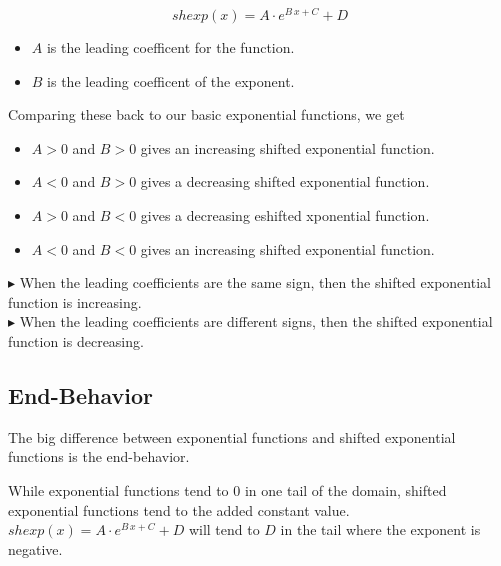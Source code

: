 \documentclass{ximera}
\begin{document}
\[
shexp(x) = A \cdot e^{B \, x + C} + D
\]





\begin{itemize}
  \item $A$ is the leading coefficent for the function.
  \item $B$ is the leading coefficent of the exponent.
\end{itemize}


Comparing these back to our basic exponential functions, we get



\begin{itemize}
  \item $A > 0$ and $B > 0$ gives an increasing shifted exponential function.
  \item $A < 0$ and $B > 0$ gives a decreasing shifted exponential function.
  \item $A > 0$ and $B < 0$ gives a decreasing eshifted xponential function.
  \item $A < 0$ and $B < 0$ gives an increasing shifted exponential function.
\end{itemize}


$\blacktriangleright$ When the leading coefficients are the same sign, then the shifted exponential function is increasing. \\

$\blacktriangleright$ When the leading coefficients are different signs, then the shifted exponential function is decreasing. \\





\subsection{End-Behavior}



The big difference between exponential functions and shifted exponential functions is the end-behavior. \



While exponential functions tend to $0$ in one tail of the domain, shifted exponential functions tend to the added constant value. \\



$shexp(x) = A \cdot e^{B \, x + C} + D$ will tend to $D$ in the tail where the exponent is negative. \\
\end{document}

